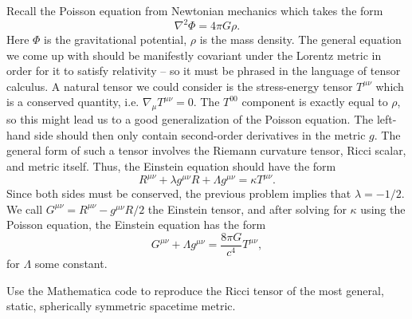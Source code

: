 \documentclass{../../templates/lkx_pset}
\begin{document}
\begin{solution}
  Recall the Poisson equation from Newtonian mechanics which takes the form
  \[
      \nabla^2 \Phi = 4\pi G \rho.
  \]
  Here $\Phi$ is the gravitational potential, $\rho$ is the mass density. The general equation we come up with should be manifestly covariant under the Lorentz metric in order for it to satisfy relativity -- so it must be phrased in the language of tensor calculus. A natural tensor we could consider is the stress-energy tensor $T^{\mu\nu}$ which is a conserved quantity, i.e. $\nabla_\mu T^{\mu\nu} = 0$. The $T^{00}$ component is exactly equal to $\rho$, so this might lead us to a good generalization of the Poisson equation. The left-hand side should then only contain second-order derivatives in the metric $g$. The general form of such a tensor involves the Riemann curvature tensor, Ricci scalar, and metric itself. Thus, the Einstein equation should have the form
  \[
    R^{\mu\nu} + \lambda g^{\mu\nu} R + \Lambda g^{\mu\nu} = \kappa T^{\mu\nu}.
  \]
  Since both sides must be conserved, the previous problem implies that $\lambda=-1/2$. We call $G^{\mu\nu} = R^{\mu\nu}-g^{\mu\nu}R/2$ the Einstein tensor, and after solving for $\kappa$ using the Poisson equation, the Einstein equation has the form
  \[
    G^{\mu\nu} + \Lambda g^{\mu\nu} = \frac{8\pi G}{c^4}T^{\mu\nu},
  \]
  for $\Lambda$ some constant.
\end{solution}

\begin{problem}{7}
  Use the Mathematica code to reproduce the Ricci tensor of the most general, static, spherically symmetric spacetime metric.
\end{problem}
\end{document}
